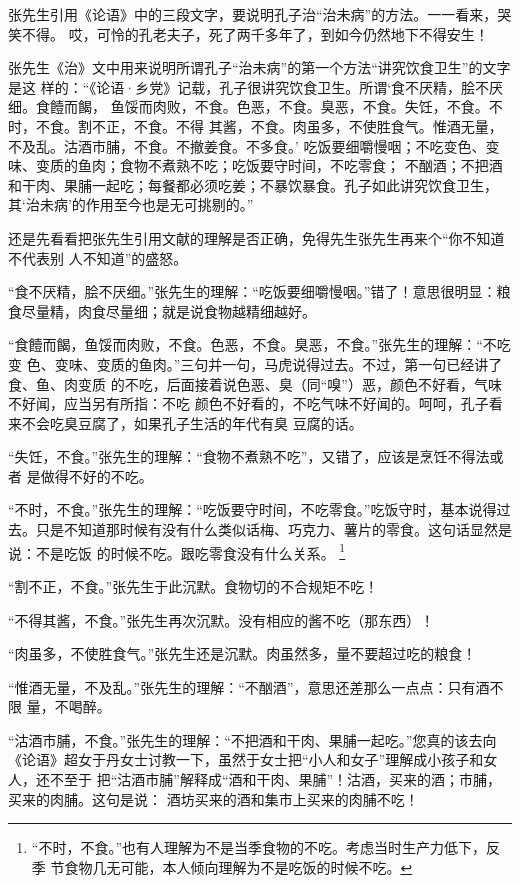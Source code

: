张先生引用《论语》中的三段文字，要说明孔子治“治未病”的方法。一一看来，哭笑不得。
哎，可怜的孔老夫子，死了两千多年了，到如今仍然地下不得安生！

张先生《治》文中用来说明所谓孔子“治未病”的第一个方法“讲究饮食卫生”的文字是这
样的：“《论语·乡党》记载，孔子很讲究饮食卫生。所谓‘食不厌精，脍不厌细。食饐而餲，
鱼馁而肉败，不食。色恶，不食。臭恶，不食。失饪，不食。不时，不食。割不正，不食。不得
其酱，不食。肉虽多，不使胜食气。惟酒无量，不及乱。沽酒市脯，不食。不撤姜食。不多食。’
吃饭要细嚼慢咽；不吃变色、变味、变质的鱼肉；食物不煮熟不吃；吃饭要守时间，不吃零食；
不酗酒；不把酒和干肉、果脯一起吃；每餐都必须吃姜；不暴饮暴食。孔子如此讲究饮食卫生，
其‘治未病’的作用至今也是无可挑剔的。”

还是先看看把张先生引用文献的理解是否正确，免得先生张先生再来个“你不知道不代表别
人不知道”的盛怒。

“食不厌精，脍不厌细。”张先生的理解：“吃饭要细嚼慢咽。”错了！意思很明显：粮
食尽量精，肉食尽量细；就是说食物越精细越好。

“食饐而餲，鱼馁而肉败，不食。色恶，不食。臭恶，不食。”张先生的理解：“不吃变
色、变味、变质的鱼肉。”三句并一句，马虎说得过去。不过，第一句已经讲了食、鱼、肉变质
的不吃，后面接着说色恶、臭（同“嗅”）恶，颜色不好看，气味不好闻，应当另有所指：不吃
颜色不好看的，不吃气味不好闻的。呵呵，孔子看来不会吃臭豆腐了，如果孔子生活的年代有臭
豆腐的话。

“失饪，不食。”张先生的理解：“食物不煮熟不吃”，又错了，应该是烹饪不得法或者
是做得不好的不吃。

“不时，不食。”张先生的理解：“吃饭要守时间，不吃零食。”吃饭守时，基本说得过
去。只是不知道那时候有没有什么类似话梅、巧克力、薯片的零食。这句话显然是说：不是吃饭
的时候不吃。跟吃零食没有什么关系。
\footnote{“不时，不食。”也有人理解为不是当季食物的不吃。考虑当时生产力低下，反季
节食物几无可能，本人倾向理解为不是吃饭的时候不吃。}

“割不正，不食。”张先生于此沉默。食物切的不合规矩不吃！

“不得其酱，不食。”张先生再次沉默。没有相应的酱不吃（那东西）！

“肉虽多，不使胜食气。”张先生还是沉默。肉虽然多，量不要超过吃的粮食！

“惟酒无量，不及乱。”张先生的理解：“不酗酒”，意思还差那么一点点：只有酒不限
量，不喝醉。

“沽酒市脯，不食。”张先生的理解：“不把酒和干肉、果脯一起吃。”您真的该去向
《论语》超女于丹女士讨教一下，虽然于女士把“小人和女子”理解成小孩子和女人，还不至于
把“沽酒市脯”解释成“酒和干肉、果脯”！沽酒，买来的酒；市脯，买来的肉脯。这句是说：
酒坊买来的酒和集市上买来的肉脯不吃！

